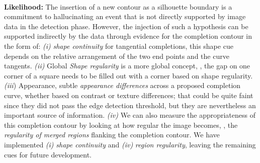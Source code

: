 \noindent\\
{\bf Likelihood:} The insertion of a new contour as a silhouette boundary is a commitment to hallucinating an event that is not directly supported by image data in the detection phase. However, the injection of such a hypothesis can be supported indirectly by the data through evidence for the completion contour in the form of: \emph{(i)} \emph{shape continuity} for tangential completions, this shape cue depends on the relative arrangement of the two end points and the curve tangents. \emph{(ii)} Global \emph{Shape regularity} is a more global concept, \eg, the gap on one corner of a square needs to be filled out with a corner based on shape regularity. \emph{(iii}) Appearance, subtle \emph{appearance differences} across a proposed completion curve, whether based on contrast or texture differences; that could be quite faint since they did not pass the edge detection threshold, but they are nevertheless an important source of information. \emph{(iv)} We can also measure the appropriateness of this completion contour by looking at how regular the image becomes, \ie, the \emph{regularity of merged regions} flanking the completion contour. We have implemented \emph{(i)} \emph{shape continuity} and \emph{(iv)} \emph{region regularity}, leaving the remaining cues for future development. 



